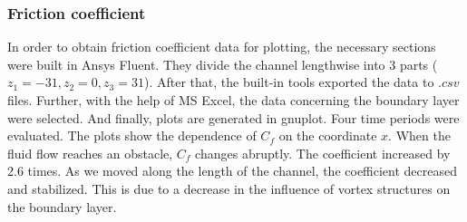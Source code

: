 \subsubsection{Friction coefficient}
	In order to obtain friction coefficient data for plotting, the necessary sections were built in Ansys Fluent. They divide the channel lengthwise into 3 parts ($z_1 = -31, z_2 = 0, z_3 = 31$). After that, the built-in tools exported the data to $.csv$ files. Further, with the help of MS Excel, the data concerning the boundary layer were selected. And finally, plots are generated in gnuplot. 
	Four time periods were evaluated. The plots show the dependence of $C_f$ on the coordinate $x$. When the fluid flow reaches an obstacle, $C_f$ changes abruptly. The coefficient increased by 2.6 times. As we moved along the length of the channel, the coefficient decreased and stabilized. This is due to a decrease in the influence of vortex structures on the boundary layer.
